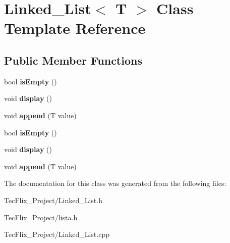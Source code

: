 \hypertarget{classLinked__List}{}\section{Linked\+\_\+\+List$<$ T $>$ Class Template Reference}
\label{classLinked__List}
\subsection*{Public Member Functions}
\begin{DoxyCompactItemize}
\item 
\mbox{\label{classLinked__List_af532cd4d0526ebf5c15548773ebc6042}} 
bool {\bfseries is\+Empty} ()
\item 
\mbox{\label{classLinked__List_a8848ae421049e10f74257159d74242e0}} 
void {\bfseries display} ()
\item 
\mbox{\label{classLinked__List_ac94889c17c96e15f7a579693b5896905}} 
void {\bfseries append} (T value)
\item 
\mbox{\label{classLinked__List_af532cd4d0526ebf5c15548773ebc6042}} 
bool {\bfseries is\+Empty} ()
\item 
\mbox{\label{classLinked__List_a8848ae421049e10f74257159d74242e0}} 
void {\bfseries display} ()
\item 
\mbox{\label{classLinked__List_ac94889c17c96e15f7a579693b5896905}} 
void {\bfseries append} (T value)
\end{DoxyCompactItemize}


The documentation for this class was generated from the following files\+:\begin{DoxyCompactItemize}
\item 
Tec\+Flix\+\_\+\+Project/Linked\+\_\+\+List.\+h\item 
Tec\+Flix\+\_\+\+Project/lista.\+h\item 
Tec\+Flix\+\_\+\+Project/Linked\+\_\+\+List.\+cpp\end{DoxyCompactItemize}
